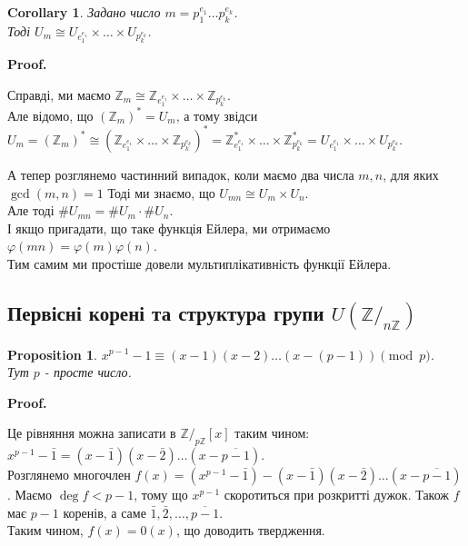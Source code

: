 \documentclass[a4paper, 14pt]{extarticle}
\makeatletter
\theoremstyle{theoremdd}
\theoremstyle{theoremdd}
\theoremstyle{theoremdd}
\theoremstyle{theoremdd}
\theoremstyle{theoremdd}
\newtheorem{proposition}[theorem]{Proposition}
\theoremstyle{theoremdd}
\theoremstyle{theoremdd}
\theoremstyle{theoremdd}
\newtheorem{corollary}[theorem]{Corollary}
\def\qed{$\blacksquare$}
\renewenvironment{proof}[1][Proof.\\]{\par
\pushQED{\hfill \qed}%
\normalfont \topsep6\p@\@plus6\p@\relax
\trivlist
\item\relax
{\bfseries
#1\@addpunct{.}}\hspace\labelsep\ignorespaces
}{%
\popQED\endtrivlist\@endpefalse
}
\makeatother
\begin{document}
\begin{corollary}
Задано число $m = p_1^{e_1} \dots p_k^{e_k}$.\\
Тоді $U_m \cong U_{e_1^{e_1}} \times \dots \times U_{p_k^{e_k}}$.
\end{corollary}

\begin{proof}
Справді, ми маємо $\mathbb{Z}_m \cong \mathbb{Z}_{e_1^{e_1}} \times \dots \times \mathbb{Z}_{p_k^{e_k}}$.\\
Але відомо, що $(\mathbb{Z}_m)^* = U_m$, а тому звідси\\
$U_m = (\mathbb{Z}_m)^* \cong (\mathbb{Z}_{e_1^{e_1}} \times \dots \times \mathbb{Z}_{p_k^{e_k}})^* = \mathbb{Z}^*_{e_1^{e_1}} \times \dots \times \mathbb{Z}^*_{p_k^{e_k}} = U_{e_1^{e_1}} \times \dots \times U_{p_k^{e_k}}$.
\end{proof}

А тепер розглянемо частинний випадок, коли маємо два числа $m,n$, для яких $\gcd(m,n) = 1$ Тоді ми знаємо, що $U_{mn} \cong U_m \times U_n$.\\
Але тоді $\# U_{mn} = \# U_m \cdot \# U_n$.\\
І якщо пригадати, що таке функція Ейлера, ми отримаємо\\
$\varphi(mn) = \varphi(m)\varphi(n)$.\\
Тим самим ми простіше довели мультиплікативність функції Ейлера.

\subsection{Первісні корені та структура групи $U(\mathbb{Z}/_{n\mathbb{Z}})$}
\begin{proposition}
$x^{p-1} - 1 \equiv (x-1)(x-2) \dots (x-(p-1)) \pmod p$.\\
Тут $p$ - просте число.
\end{proposition}

\begin{proof}
Це рівняння можна записати в $\mathbb{Z}/_{p \mathbb{Z}}[x]$ таким чином:\\
$x^{p-1} - \bar{1} = (x-\bar{1})(x-\bar{2}) \dots (x-\overline{p-1})$.\\
Розглянемо многочлен $f(x) = (x^{p-1} - \bar{1}) - (x-\bar{1})(x-\bar{2}) \dots (x-\overline{p-1})$. Маємо $\deg f < p-1$, тому що $x^{p-1}$ скоротиться при розкритті дужок. Також $f$ має $p-1$ коренів, а саме $\bar{1},\bar{2},\dots,\overline{p-1}$.\\
Таким чином, $f(x) = 0(x)$, що доводить твердження.
\end{proof}
\end{document}
